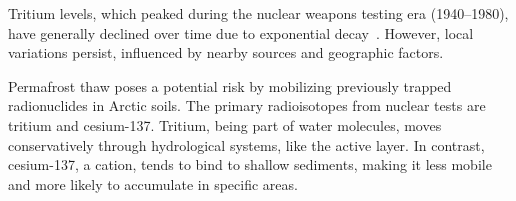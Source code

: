 Tritium levels, which peaked during the nuclear weapons testing era (1940–1980), have generally declined over time due to exponential decay~\citep{bondPermafrostThawImplications2018,rozanskiTritiumGlobalAtmosphere1991,schmidtOverviewTritiumRecords2020}. 
However, local variations persist, influenced by nearby sources and geographic factors.

Permafrost thaw poses a potential risk by mobilizing previously trapped radionuclides in Arctic soils. 
The primary radioisotopes from nuclear tests are tritium and cesium-137. 
Tritium, being part of water molecules, moves conservatively through hydrological systems, like the active layer. 
In contrast, cesium-137, a cation, tends to bind to shallow sediments, making it less mobile and more likely to accumulate in specific areas.
